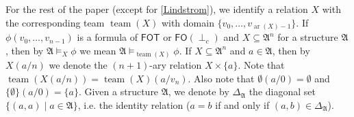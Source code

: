 \documentclass[a4paper]{amsart}
\theoremstyle{definition}
\theoremstyle{remark}
\newcommand{\A}{\mathcal{A}}
\newcommand{\B}{\mathcal{B}}
\newcommand\fot{\mathsf{FOT}}
\newcommand\foil{\mathsf{FO}(\perp_c)}
\DeclareMathOperator{\team}{team}
\DeclareMathOperator{\ar}{ar}
\theoremstyle{definition}
\renewcommand{\A}{\mathfrak{A}}
\renewcommand{\B}{\mathfrak{B}}
\begin{document}


For the rest of the paper (except for \cref{Lindstrom}), we identify a relation $X$ with the corresponding team $\team(X)$ with domain $\{v_0,\dots,v_{\ar(X)-1}\}$. If $\phi(v_0,\dots,v_{n-1})$ is a formula of $\fot$ or $\foil$ and $X\subseteq\A^n$ for a structure $\A$, then by $\A\models_X\phi$ we mean $\A\models_{\team(X)}\phi$. If $X\subseteq\A^n$ and $a\in\A$, then by $X(a/n)$ we denote the $(n+1)$-ary relation $X\times\{a\}$. Note that $\team(X(a/n)) = \team(X)(a/v_n)$. Also note that $\emptyset(a/0) = \emptyset$ and $\{\emptyset\}(a/0) = \{a\}$. Given a structure $\A$, we denote by $\Delta_\A$ the diagonal set $\{(a,a) \mid a\in\A\}$, i.e. the identity relation ($a = b$ if and only if $(a,b)\in\Delta_\A$).
\end{document}
